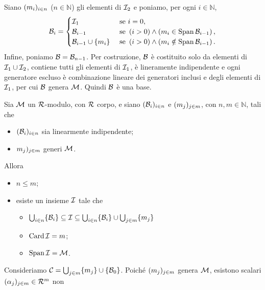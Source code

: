 \Proof Siano $(m_i)_{i \in n}$ ($n \in \mathbb{N}$) gli
elementi di $\mathcal{I}_2$ e poniamo, per ogni $i \in \mathbb{N}$,
\[
  \mathcal{B}_i =
  \begin{cases}
	  \mathcal{I}_1&\text{ se }i = 0,\\
  	\mathcal{B}_{i - 1}&\text{ se }\left ( i > 0 \right ) \wedge \left ( m_i \in
	  	\operatorname{Span}{\mathcal{B}_{i - 1}} \right ),\\
  	\mathcal{B}_{i - 1} \cup \lbrace m_i \rbrace
	  	&\text{ se }\left ( i > 0 \right ) \wedge \left ( m_i \notin
		  \operatorname{Span}{\mathcal{B}_{i - 1}} \right ).
  \end{cases}
\]
Infine, poniamo $\mathcal{B} = \mathcal{B}_{n - 1}$. Per costruzione,
$\mathcal{B}$ \`e costituito solo da elementi di
$\mathcal{I}_1 \cup \mathcal{I}_2$, contiene tutti gli elementi di $\mathcal{I}_1$, \`e
lineramente indipendente e ogni generatore escluso \`e combinazione
lineare dei generatori inclusi e degli elementi di $\mathcal{I}_1$, per
cui $\mathcal{B}$ genera $\mathcal{M}$. Quindi $\mathcal{B}$ \`e una base.
\EndProof
\begin{Lemma}
	 Sia $\mathcal{M}$ un $\mathcal{R}$-modulo,
	con $\mathcal{R}$ corpo, e siano $(\mathcal{B}_i)_{i \in n}$ e
	$(m_j)_{j \in m}$, con $n, m \in \mathbb{N}$, tali
	che
	\begin{itemize}
		\item $(\mathcal{B}_i)_{i \in n}$ sia linearmente
		indipendente;
		\item $m_j)_{j \in m}$ generi $\mathcal{M}$.
	\end{itemize}
	Allora
	\begin{itemize}
		\item $n \leq m$;
		\item esiste un insieme $\mathcal{I}$ tale che
		\begin{itemize}
			\item
		$\bigcup_{i \in n} \lbrace \mathcal{B}_i \rbrace \subseteq
		\mathcal{I} \subseteq
		\bigcup_{i \in n} \lbrace \mathcal{B}_i \rbrace \cup
		\bigcup_{j \in m} \lbrace m_j \rbrace$
			\item $\operatorname{Card}{\mathcal{I}} = m$;
			\item $\operatorname{Span}{\mathcal{I}} = \mathcal{M}$.
		\end{itemize}
	\end{itemize}
\end{Lemma}
\Proof Consideriamo $\mathcal{C} = \bigcup_{j \in m} \lbrace m_j
\rbrace \cup \lbrace \mathcal{B}_0 \rbrace$. Poich\'e $(m_j)_{j \in m}$
genera $\mathcal{M}$, esistono scalari $(\alpha_j)_{j \in m} \in \mathcal{R}^m$ non
